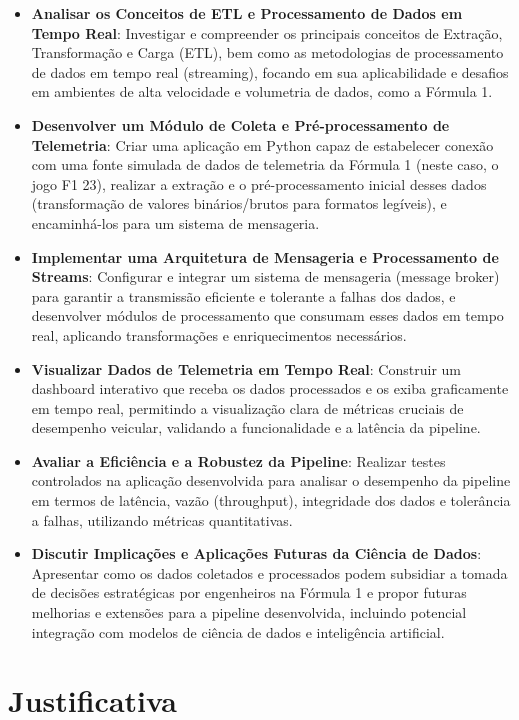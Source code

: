 \documentclass[12pt, %
openright, 
oneside, %
a4paper,    %
brazil]{facom-ufu-abntex2}
\begin{document}
\begin{itemize}
  \item \textbf{Analisar os Conceitos de ETL e Processamento de Dados em Tempo Real}: Investigar 
  e compreender os principais conceitos de Extração, Transformação e Carga (ETL), 
  bem como as metodologias de processamento de dados em tempo real (streaming), 
  focando em sua aplicabilidade e desafios em ambientes de alta velocidade e volumetria 
  de dados, como a Fórmula 1.
  \item \textbf{Desenvolver um Módulo de Coleta e Pré-processamento de Telemetria}: Criar uma 
  aplicação em Python capaz de estabelecer conexão com uma fonte simulada de dados de 
  telemetria da Fórmula 1 (neste caso, o jogo F1 23), realizar a extração e o pré-processamento inicial desses 
  dados (transformação de valores binários/brutos para formatos legíveis), e 
  encaminhá-los para um sistema de mensageria.
  \item \textbf{Implementar uma Arquitetura de Mensageria e Processamento de Streams}: Configurar 
  e integrar um sistema de mensageria (message broker) para garantir a transmissão 
  eficiente e tolerante a falhas dos dados, e desenvolver módulos de processamento que 
  consumam esses dados em tempo real, aplicando transformações e enriquecimentos 
  necessários.
  \item \textbf{Visualizar Dados de Telemetria em Tempo Real}: Construir um dashboard 
  interativo que receba os dados processados e os exiba graficamente em tempo real, 
  permitindo a visualização clara de métricas cruciais de desempenho veicular, validando 
  a funcionalidade e a latência da pipeline.
  \item \textbf{Avaliar a Eficiência e a Robustez da Pipeline}: Realizar testes controlados 
  na aplicação desenvolvida para analisar o desempenho da pipeline em termos de latência, 
  vazão (throughput), integridade dos dados e tolerância a falhas, utilizando métricas 
  quantitativas.
  \item \textbf{Discutir Implicações e Aplicações Futuras da Ciência de Dados}: Apresentar 
  como os dados coletados e processados podem subsidiar a tomada de decisões estratégicas 
  por engenheiros na Fórmula 1 e propor futuras melhorias e extensões para a pipeline 
  desenvolvida, incluindo potencial integração com modelos de ciência de dados e 
  inteligência artificial.
\end{itemize}

\section{Justificativa}
\end{document}
